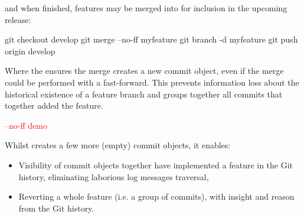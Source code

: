 \noindent and when finished, features may be merged into  for inclusion in the upcoming release:

\begin{git-bash}
    git checkout develop
    git merge --no-ff myfeature
    git branch -d myfeature
    git push origin develop
\end{git-bash}

Where the  ensures the merge creates a new commit object, even if the merge could be performed with a fast-forward. This prevents information loss about the historical existence of a feature branch and groups together all commits that together added the feature.

\begin{center}
	\textcolor{red}{\ttfamily --no-ff demo}
\end{center}

\noindent Whilst  creates a few more (empty) commit objects, it enables:

\begin{itemize}
	\item Visibility of commit objects together have implemented a feature in the Git history, eliminating laborious log messages traversal,
	\item Reverting a whole feature (i.e. a group of commits), with insight and reason from the Git history.
\end{itemize}














